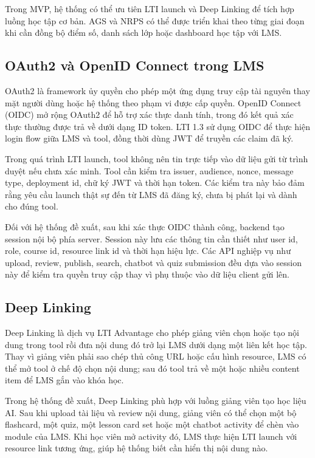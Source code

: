 Trong MVP, hệ thống có thể ưu tiên LTI launch và Deep Linking để tích hợp luồng
học tập cơ bản. AGS và NRPS có thể được triển khai theo từng giai đoạn khi cần
đồng bộ điểm số, danh sách lớp hoặc dashboard học tập với LMS.

\subsection{OAuth2 và OpenID Connect trong LMS}
\label{subsec:oauth2-oidc-lms}

OAuth2 là framework ủy quyền cho phép một ứng dụng truy cập tài nguyên thay mặt
người dùng hoặc hệ thống theo phạm vi được cấp quyền. OpenID Connect (OIDC) mở
rộng OAuth2 để hỗ trợ xác thực danh tính, trong đó kết quả xác thực thường được
trả về dưới dạng ID token. LTI 1.3 sử dụng OIDC để thực hiện login flow giữa LMS
và tool, đồng thời dùng JWT để truyền các claim đã ký.

Trong quá trình LTI launch, tool không nên tin trực tiếp vào dữ liệu gửi từ
trình duyệt nếu chưa xác minh. Tool cần kiểm tra issuer, audience, nonce,
message type, deployment id, chữ ký JWT và thời hạn token. Các kiểm tra này bảo
đảm rằng yêu cầu launch thật sự đến từ LMS đã đăng ký, chưa bị phát lại và dành
cho đúng tool.

Đối với hệ thống đề xuất, sau khi xác thực OIDC thành công, backend tạo session
nội bộ phía server. Session này lưu các thông tin cần thiết như user id, role,
course id, resource link id và thời hạn hiệu lực. Các API nghiệp vụ như upload,
review, publish, search, chatbot và quiz submission đều dựa vào session này để
kiểm tra quyền truy cập thay vì phụ thuộc vào dữ liệu client gửi lên.

\subsection{Deep Linking}
\label{subsec:deep-linking}

Deep Linking là dịch vụ LTI Advantage cho phép giảng viên chọn hoặc tạo nội dung
trong tool rồi đưa nội dung đó trở lại LMS dưới dạng một liên kết học tập. Thay
vì giảng viên phải sao chép thủ công URL hoặc cấu hình resource, LMS có thể mở
tool ở chế độ chọn nội dung; sau đó tool trả về một hoặc nhiều content item để
LMS gắn vào khóa học.

Trong hệ thống đề xuất, Deep Linking phù hợp với luồng giảng viên tạo học liệu
AI. Sau khi upload tài liệu và review nội dung, giảng viên có thể chọn một bộ
flashcard, một quiz, một lesson card set hoặc một chatbot activity để chèn vào
module của LMS. Khi học viên mở activity đó, LMS thực hiện LTI launch với
resource link tương ứng, giúp hệ thống biết cần hiển thị nội dung nào.

